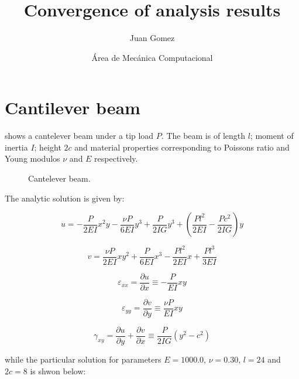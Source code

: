 \documentclass[12pt,letterpaper]{article}
\author{Juan Gomez}
\author{Área de Mecánica Computacional}
\title{\textbf{Convergence of analysis results}}
\begin{document}
\maketitle

\section{Cantilever beam}
 shows a cantelever beam under a tip load $P$. The beam is of length $l$; moment of inertia $I$; height $2c$ and material properties corresponding to Poissons ratio and Young modulos $\nu$ and $E$ respectively.

\begin{figure}[H]
\centering
{}
\caption{Cantelever beam.}
\label{fig:viga}
\end{figure}

The analytic solution \citep{book:timoshenko} is given by:

\[u =  - \frac{P}{{2EI}}{x^2}y - \frac{{\nu P}}{{6EI}}{y^3} + \frac{P}{{2IG}}{y^3} + \left( {\frac{{P{l^2}}}{{2EI}} - \frac{{P{c^2}}}{{2IG}}} \right)y\]

\[v = \frac{{\nu P}}{{2EI}}x{y^2} + \frac{P}{{6EI}}{x^3} - \frac{{P{l^2}}}{{2EI}}x + \frac{{P{l^3}}}{{3EI}}\]

\[{\varepsilon _{xx}} = \frac{{\partial u}}{{\partial x}} \equiv  - \frac{P}{{EI}}xy\]

\[{\varepsilon _{yy}} = \frac{{\partial v}}{{\partial y}} \equiv \frac{{\nu P}}{{EI}}xy\]

\[{\gamma _{xy}} = \frac{{\partial u}}{{\partial y}} + \frac{{\partial v}}{{\partial x}} \equiv \frac{P}{{2IG}}\left( {{y^2} - {c^2}} \right)\]

while the particular solution for parameters $E=1000.0$, $\nu=0.30$, $l=24$ and $2c=8$ is shwon below:
\end{document}

